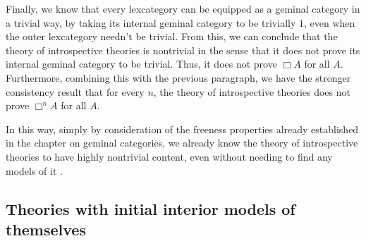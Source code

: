 Finally, we know that every lexcategory can be equipped as a geminal category in a trivial way, by taking its internal geminal category to be trivially $1$, even when the outer lexcategory needn't be trivial. From this, we can conclude that the theory of introspective theories is nontrivial in the sense that it does not prove its internal geminal category to be trivial. Thus, it does not prove $\Box A$ for all $A$. Furthermore, combining this with the previous paragraph, we have the stronger consistency result that for every $n$, the theory of introspective theories does not prove $\Box^n A$ for all $A$.

In this way, simply by consideration of the freeness properties already established in the chapter on geminal categories, we already know the theory of introspective theories to have highly nontrivial content, even without needing to find any models of it .


\subsection{Theories with initial interior models of themselves}

